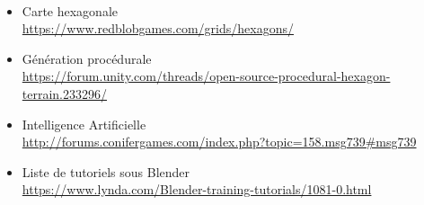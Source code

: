 \documentclass[12pt]{report}
\begin{document}
\paragraph{}

\begin{itemize}[label=\textbullet]
\item Carte hexagonale \\ \url{https://www.redblobgames.com/grids/hexagons/}
\item Génération procédurale \\ \url{https://forum.unity.com/threads/open-source-procedural-hexagon-terrain.233296/}
\item Intelligence Artificielle \\ \url{http://forums.conifergames.com/index.php?topic=158.msg739#msg739}
\item Liste de tutoriels sous Blender \\ \url{https://www.lynda.com/Blender-training-tutorials/1081-0.html}
\end{itemize}
\end{document}
